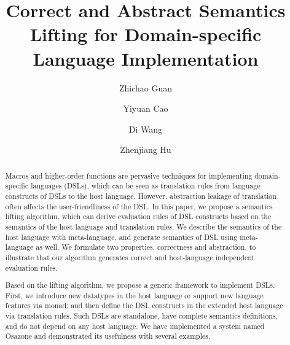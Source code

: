 \documentclass[acmsmall,manuscript,screen,review,anonymous]{acmart}
\begin{document}
\title{Correct and Abstract Semantics Lifting for Domain-specific Language Implementation}

\author{Zhichao Guan}
\author{Yiyuan Cao}
\author{Di Wang}
\author{Zhenjiang Hu}
\renewcommand{\shortauthors}{Trovato et al.}

\begin{abstract}
Macros and higher-order functions are pervasive techniques for implementing domain-specific languages (DSLs),
 which can be seen as translation rules from language constructs of DSLs to the host language.
However, abstraction leakage of translation often affects the user-friendliness of the DSL.
In this paper, we propose a semantics lifting algorithm,
 which can derive evaluation rules of DSL constructs based on the semantics of the host language and translation rules.
We describe the semantics of the host language with meta-language,
 and generate semantics of DSL using meta-language as well.
We formulate two properties, correctness and abstraction,
 to illustrate that our algorithm generates correct and host-language independent evaluation rules.

Based on the lifting algorithm, we propose a generic framework to implement DSLs.
First, we introduce new datatypes in the host language or support new language features via monad;
 and then define the DSL constructs in the extended host language via translation rules.
Such DSLs are standalone, have complete semantics definitions,
 and do not depend on any host language.
We have implemented a system named Osazone and demonstrated its usefulness with several examples.
\end{abstract}
\end{document}
